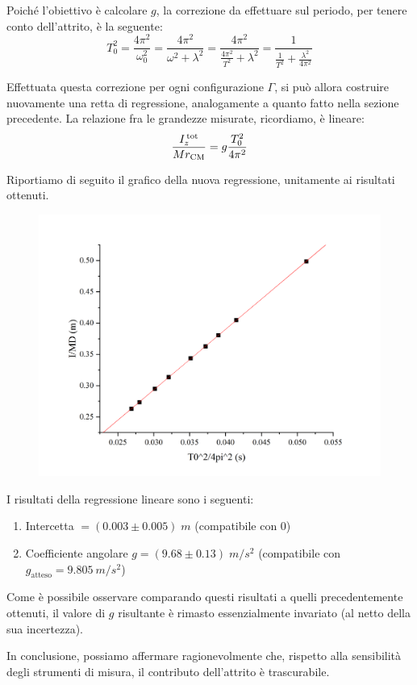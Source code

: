\documentclass{article}
\begin{document}
Poiché l'obiettivo è calcolare $g$, la correzione da effettuare
sul periodo, per tenere conto dell'attrito, è la seguente:
\[
  T_0^2 = \frac{4\pi^2}{\omega_0^2}
    = \frac{4\pi^2}{\omega^2 + \lambda^2}
    = \frac{4\pi^2}{\frac{4\pi^2}{T^2} + \lambda^2}
    = \frac{1}{\frac{1}{T^2} + \frac{\lambda^2}{4\pi^2}}
\]

Effettuata questa correzione per ogni configurazione $\Gamma$,
si può allora costruire nuovamente una retta di regressione,
analogamente a quanto fatto nella sezione precedente.
La relazione fra le grandezze misurate, ricordiamo, è lineare:
\[ \frac{I_z^\text{\,tot}}{Mr_\text{CM}} = g \frac{T_0^2}{4\pi^2} \]

Riportiamo di seguito il grafico della nuova regressione,
unitamente ai risultati ottenuti.

\begin{figure}[H]
  \includegraphics[trim={2cm 1cm 2cm 2.1cm},clip,width=\textwidth]{img/regressione-2.png}
\end{figure}

I risultati della regressione lineare sono i seguenti:
\begin{enumerate}
  \item Intercetta $= (0.003 \pm 0.005)\;\unit{m}$ (compatibile con $0$)
  \item Coefficiente angolare $g = (9.68 \pm 0.13)\;\unit{m\per s^2}$
    (compatibile con $g_\text{atteso} = \qty{9.805}{m\per s^2}$)
\end{enumerate}

Come è possibile osservare comparando questi risultati a
quelli precedentemente ottenuti, il valore di $g$ risultante
è rimasto essenzialmente invariato (al netto della sua incertezza).

In conclusione, possiamo affermare ragionevolmente che,
rispetto alla sensibilità degli strumenti di misura,
il contributo dell'attrito è trascurabile.
\end{document}
